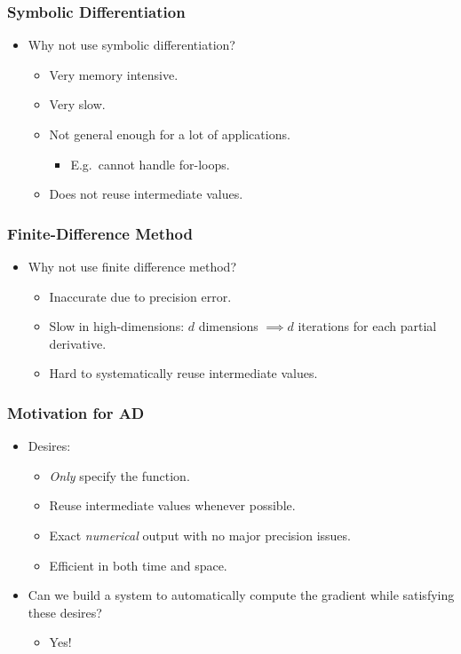 \begin{frame}
\frametitle{Symbolic Differentiation}
\begin{itemize}
\item Why not use symbolic differentiation?~\cite{margossian:2018}
    \begin{itemize}
        \item Very memory intensive.
        \item Very slow.
        \item Not general enough for a lot of applications.
            \begin{itemize}
                \item E.g.\ cannot handle for-loops.
            \end{itemize}
        \item Does not reuse intermediate values.
    \end{itemize}
\end{itemize}
\end{frame}

\begin{frame}
\frametitle{Finite-Difference Method}
\begin{itemize}
\item Why not use finite difference method?~\cite{margossian:2018}
    \begin{itemize}
        \item Inaccurate due to precision error.
        \item Slow in high-dimensions: $d$ dimensions $\implies d$ iterations for each partial derivative.
        \item Hard to systematically reuse intermediate values.
    \end{itemize}
\end{itemize}
\end{frame}

\begin{frame}
\frametitle{Motivation for AD}
\begin{itemize}
\item Desires:
    \begin{itemize}
        \item \emph{Only} specify the function.
        \item Reuse intermediate values whenever possible.
        \item Exact \emph{numerical} output with no major precision issues.
        \item Efficient in both time and space.
    \end{itemize}
\item Can we build a system to automatically compute the gradient while satisfying these desires?
    \pause%
    \begin{itemize}
        \item Yes!
    \end{itemize}
\end{itemize}
\end{frame}

